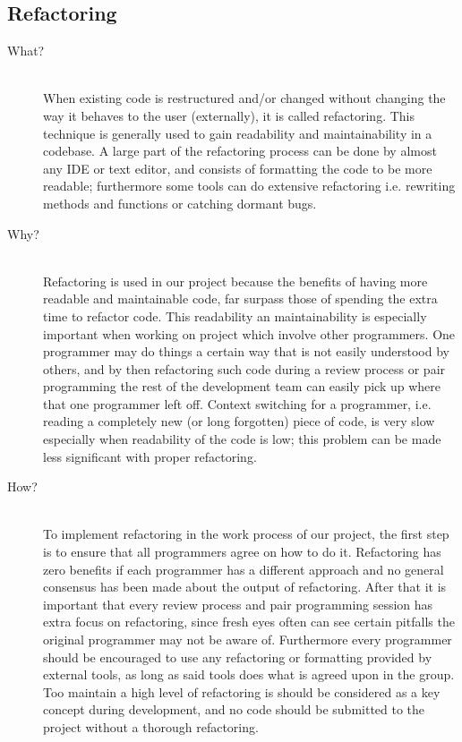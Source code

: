 \subsection*{Refactoring} %
\label{sub:refactoring}
\begin{description}
    \item[What?]\hfill\\
    When existing code is restructured and/or changed without changing the way it behaves to the user (externally), it is called refactoring.
This technique is generally used to gain readability and maintainability in a codebase.
A large part of the refactoring process can be done by almost any IDE or text editor, and consists of formatting the code to be more readable; furthermore some tools can do extensive refactoring i.e. rewriting methods and functions or catching dormant bugs.

    \item[Why?]\hfill\\ 
    Refactoring is used in our project because the benefits of having more readable and maintainable code, far surpass those of spending the extra time to refactor code.
    This readability an maintainability is especially important when working on project which involve other programmers. 
    One programmer may do things a certain way that is not easily understood by others, and by then refactoring such code during a review process or pair programming the rest of the development team can easily pick up where that one programmer left off.
    Context switching for a programmer, i.e. reading a completely new (or long forgotten) piece of code, is very slow especially when readability of the code is low; this problem can be made less significant with proper refactoring. 
    
    \item[How?]\hfill\\
    To implement refactoring in the work process of our project, the first step is to ensure that all programmers agree on how to do it.
    Refactoring has zero benefits if each programmer has a different approach and no general consensus has been made about the output of refactoring.
    After that it is important that every review process and pair programming session has extra focus on refactoring, since fresh eyes often can see certain pitfalls the original programmer may not be aware of.
    Furthermore every programmer should be encouraged to use any refactoring or formatting provided by external tools, as long as said tools does what is agreed upon in the group. 
    Too maintain a high level of refactoring is should be considered as a key concept during development, and no code should be submitted to the project without a thorough refactoring.  
\end{description}                       
